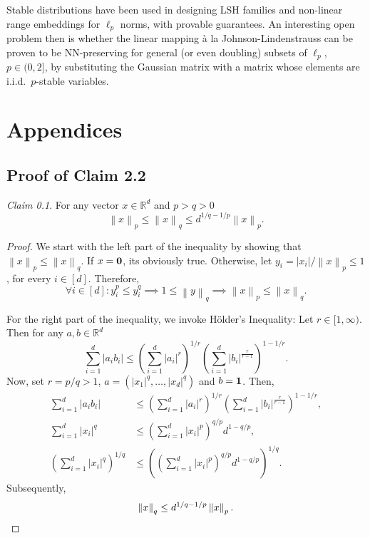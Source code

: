 \documentclass[10pt,a4paper,twoside]{book}
\newcommand{\mbf}[1]{\mbox{\boldmath$\rm{#1}$}}
\newcommand{\rd}{\mathbb{R}^{d}}
\newcommand{\norm}[1]{\left \rVert {#1} \right \rVert}
\theoremstyle{definition}
\theoremstyle{remark}
\newtheorem*{claim*}{Claim}
\begin{document}
Stable distributions have been used in designing LSH families and non-linear range embeddings for $\ell_p$ norms, with provable guarantees. An interesting open problem then is whether the linear mapping \`{a} la Johnson-Lindenstrauss can be proven to be NN-preserving for general (or even doubling) subsets of $\ell_p$, $p \in (0,2]$, by substituting the Gaussian matrix with a matrix whose elements are i.i.d.\ $p$-stable variables.


\clearpage
\thispagestyle{empty}
\appendix
{}
\chapter*{Appendices}
\noappendicestocpagenum
{}
\renewcommand{\thesection}{\Alph{section}}

\section{Proof of Claim 2.2} \label{app:holder}
\begin{claim*}
For any vector $x \in \rd$ and $p>q>0$
\[ \norm{x}_p \leq \norm{x}_q \leq d^{1/q-1/p} \norm{x}_p. \]
\end{claim*}
\begin{proof}
We start with the left part of the inequality by showing that $\norm{x}_p \leq \norm{x}_q$.
If $x = \mbf{0}$, its obviously true. Otherwise, let $y_i = |x_i| / \norm{x}_p \leq 1$, for every $i \in [d]$. Therefore,
\[ \forall i \in [d]: y_i^p \leq y_i^q \implies 1 \leq \norm{y}_q \implies \norm{x}_p \leq \norm{x}_q.\]

For the right part of the inequality, we invoke H\"{o}lder's Inequality: Let $r \in [1, \infty)$. Then for any $a,b \in \rd$
\[ \sum_{i=1}^d |a_i b_i| \leq \left( \sum_{i=1}^d |a_i|^r \right)^{1/r} \left( \sum_{i=1}^d |b_i|^{\frac{r}{r-1}} \right)^{1-1/r}. \] 
Now, set $r=p/q>1$, $a = (|x_1|^q, \ldots, |x_d|^q)$ and $b=\mbf{1}$. Then,
\begin{align*}
\sum_{i=1}^d |a_i b_i| &\leq \left( \sum_{i=1}^d |a_i|^r \right)^{1/r} \left( \sum_{i=1}^d |b_i|^{\frac{r}{r-1}} \right)^{1-1/r}, \\
\sum_{i=1}^d |x_i|^q &\leq \left( \sum_{i=1}^d |x_i|^{p} \right)^{q/p} d^{1-q/p}, \\
\left( \sum_{i=1}^d |x_i|^{q} \right)^{1/q} &\leq \left( \left( \sum_{i=1}^d |x_i|^{p} \right)^{q/p} d^{1-q/p} \right)^{1/q}.
\end{align*}
Subsequently,
\[ 
\norm{x}_q \leq d^{1/q-1/p} \norm{x}_p. \qedhere
\]
\end{proof}
\end{document}

